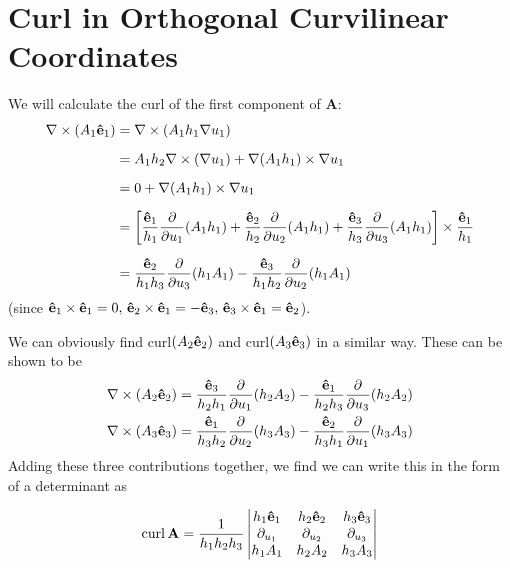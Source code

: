 \section{Curl in Orthogonal Curvilinear Coordinates}

We will calculate the curl of the first component of $\mathbf A$:
\begin{align*}
  \nabla \times (A_1 \mathbf{\hat e}_1)
  &= \nabla \times (A_1h_1\nabla u_1)\\[.2cm]
  &= A_1h_2\nabla \times (\nabla u_1) + 
  \nabla(A_1h_1) \times \nabla u_1\\[.2cm]
  &= 0 + \nabla (A_1h_1) \times \nabla u_1\\[.2cm]
  &= \left[\dfrac{\mathbf{\hat e}_1}{h_1}\dfrac{\partial }{\partial u_1}(A_1h_1) + \dfrac{\mathbf{\hat e}_2}{h_2}\dfrac{\partial }{\partial u_2}(A_1h_1) + \dfrac{\mathbf{\hat e}_3}{h_3}\dfrac{\partial }{\partial u_3}(A_1h_1)\right] \times \dfrac{\mathbf{\hat e}_1}{h_1}\\[.2cm]
  &= \dfrac{\mathbf{\hat e}_2}{h_1h_3}\dfrac{\partial }{\partial u_3}(h_1A_1) - \dfrac{\mathbf{\hat e}_3}{h_1h_2}\dfrac{\partial }{\partial u_2}(h_1A_1)
\end{align*}
(since $\mathbf{\hat e}_1 \times \mathbf{\hat e}_1 = 0,\, \mathbf{\hat e}_2 \times \mathbf{\hat e}_1 = -\mathbf{\hat e}_3,\, \mathbf{\hat e}_3 \times \mathbf{\hat e}_1 = \mathbf{\hat e}_2$). 

We can obviously find curl$(A_2\mathbf{\hat e}_2)$ and curl$(A_3\mathbf{\hat e}_3)$ in a similar way. 
These can be shown to be 
\begin{align*}
  \nabla \times (A_2 \mathbf{\hat e}_2) &= 
  \dfrac{\mathbf{\hat e}_3}{h_2h_1}\dfrac{\partial }{\partial u_1}(h_2A_2) - \dfrac{\mathbf{\hat e}_1}{h_2h_3}\dfrac{\partial }{\partial u_3}(h_2A_2)\\
    \nabla \times (A_3 \mathbf{\hat e}_3) &= 
  \dfrac{\mathbf{\hat e}_1}{h_3h_2}\dfrac{\partial }{\partial u_2}(h_3A_3) - \dfrac{\mathbf{\hat e}_2}{h_3h_1}\dfrac{\partial }{\partial u_1}(h_3A_3)
\end{align*}
Adding these three contributions together, we find we can write this in the form of a determinant as 

\begin{prop}
\[  \mathrm{curl}\,\mathbf A = \dfrac{1}{h_1h_2h_3}
  \begin{vmatrix}
  h_1\mathbf{\hat e}_1 & h_2 \mathbf{\hat e}_2 & h_3\mathbf{\hat e}_3\\
  \partial _{u_1} &\partial _{u_2} &\partial _{u_3}\\
  h_1A_1 & h_2A_2 & h_3A_3
  \end{vmatrix}
\]

\end{prop}

